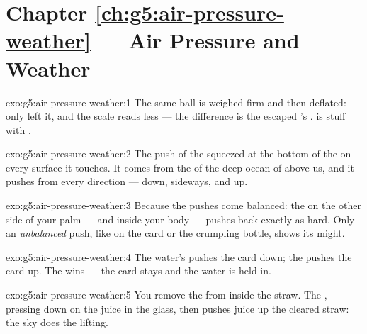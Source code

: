 \section*{Chapter \ref{ch:g5:air-pressure-weather} --- Air Pressure and Weather}

\begin{solution}{exo:g5:air-pressure-weather:1}
The same ball is weighed firm and then deflated: only  left it,
and the scale reads less --- the difference is the escaped 's
.  is stuff with .
\end{solution}

\begin{solution}{exo:g5:air-pressure-weather:2}
The push of the squeezed  at the bottom of the  on
every surface it touches. It comes from the  of the deep
ocean of  above us, and it pushes from every direction --- down,
sideways, and up.
\end{solution}

\begin{solution}{exo:g5:air-pressure-weather:3}
Because the pushes come balanced: the  on the other side of your
palm --- and inside your body --- pushes back exactly as hard.
Only an \emph{unbalanced} push, like on the card or the crumpling
bottle, shows its might.
\end{solution}

\begin{solution}{exo:g5:air-pressure-weather:4}
The water's  pushes the card down; the  pushes the
card up. The  wins --- the card stays and the water is
held in.
\end{solution}

\begin{solution}{exo:g5:air-pressure-weather:5}
You remove the \emph{} from inside the straw. The ,
pressing down on the juice in the glass, then pushes juice up the
cleared straw: the sky does the lifting.
\end{solution}

